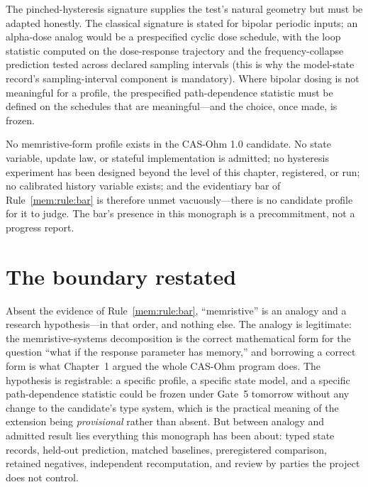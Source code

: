 The pinched-hysteresis signature supplies the test's natural geometry but must be adapted honestly. The classical signature is stated for bipolar periodic inputs; an alpha-dose analog would be a prespecified cyclic dose schedule, with the loop statistic computed on the dose-response trajectory and the frequency-collapse prediction tested across declared sampling intervals (this is why the model-state record's sampling-interval component is mandatory). Where bipolar dosing is not meaningful for a profile, the prespecified path-dependence statistic must be defined on the schedules that are meaningful---and the choice, once made, is frozen.

\begin{finding}\label{mem:find:status}
No memristive-form profile exists in the CAS-Ohm 1.0 candidate. No state variable, update law, or stateful implementation is admitted; no hysteresis experiment has been designed beyond the level of this chapter, registered, or run; no calibrated history variable exists; and the evidentiary bar of Rule~\ref{mem:rule:bar} is therefore unmet vacuously---there is no candidate profile for it to judge. The bar's presence in this monograph is a precommitment, not a progress report.
\end{finding}

\section{The boundary restated}\label{mem:sec:boundary}

Absent the evidence of Rule~\ref{mem:rule:bar}, ``memristive'' is an analogy and a research hypothesis---in that order, and nothing else. The analogy is legitimate: the memristive-systems decomposition is the correct mathematical form for the question ``what if the response parameter has memory,'' and borrowing a correct form is what Chapter~1 argued the whole CAS-Ohm program does. The hypothesis is registrable: a specific profile, a specific state model, and a specific path-dependence statistic could be frozen under Gate~5 tomorrow without any change to the candidate's type system, which is the practical meaning of the extension being \emph{provisional} rather than absent. But between analogy and admitted result lies everything this monograph has been about: typed state records, held-out prediction, matched baselines, preregistered comparison, retained negatives, independent recomputation, and review by parties the project does not control.


